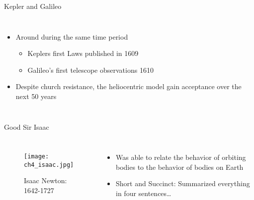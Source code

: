 \documentclass[pdf, aspectratio=169]{beamer}
\begin{document}
\begin{frame}{Kepler and Galileo}
  \begin{columns}
	\begin{itemize}
	  \item Around during the same time period
		\begin{itemize}
		  \item Keplers first Laws published in 1609
		  \item Galileo's first telescope observations 1610
		\end{itemize}
	  \item Despite church resistance, the heliocentric model gain acceptance over the next 50 years
	\end{itemize}
	\begin{center}
	\end{center}
  \end{columns}
\end{frame}
\begin{frame}{Good Sir Isaac}
  \begin{columns}
	\begin{figure}[h!]
	  \centering
	  \texttt{[image: ch4\_isaac.jpg]}
	  \caption*{Isaac Newton: 1642-1727}
	\end{figure}
	\begin{itemize}
	  \item Was able to relate the behavior of orbiting bodies to the behavior of bodies on Earth
	  \item Short and Succinct: Summarized everything in four sentences\ldots
	\end{itemize}
  \end{columns}
\end{frame}
\end{document}
